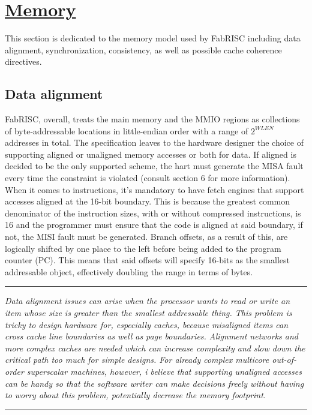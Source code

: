 \section[Memory]{\LARGE\underline{Memory}}

    \vspace{10pt}

    This section is dedicated to the memory model used by FabRISC including data alignment, synchronization, consistency, as well as possible cache coherence directives.

    \subsection[Data alignment]{Data alignment}

        \vspace{10pt}

        FabRISC, overall, treats the main memory and the MMIO regions as collections of byte-addressable locations in little-endian order with a range of \(2^{WLEN}\) addresses in total. The specification leaves to the hardware designer the choice of supporting aligned or unaligned memory accesses or both for data. If aligned is decided to be the only supported scheme, the hart must generate the MISA fault every time the constraint is violated (consult section 6 for more information). When it comes to instructions, it's mandatory to have fetch engines that support accesses aligned at the 16-bit boundary. This is because the greatest common denominator of the instruction sizes, with or without compressed instructions, is 16 and the programmer must ensure that the code is aligned at said boundary, if not, the MISI fault must be generated. Branch offsets, as a result of this, are logically shifted by one place to the left before being added to the program counter (PC). This means that said offsets will specify 16-bits as the smallest addressable object, effectively doubling the range in terms of bytes.

    \par\noindent\rule{\textwidth}{0.4pt}
    \textit{Data alignment issues can arise when the processor wants to read or write an item whose size is greater than the smallest addressable thing. This problem is tricky to design hardware for, especially caches, because misaligned items can cross cache line boundaries as well as page boundaries. Alignment networks and more complex caches are needed which can increase complexity and slow down the critical path too much for simple designs. For already complex multicore out-of-order superscalar machines, however, i believe that supporting unaligned accesses can be handy so that the software writer can make decisions freely without having to worry about this problem, potentially decrease the memory footprint.}
    \par\noindent\rule{\textwidth}{0.4pt}

